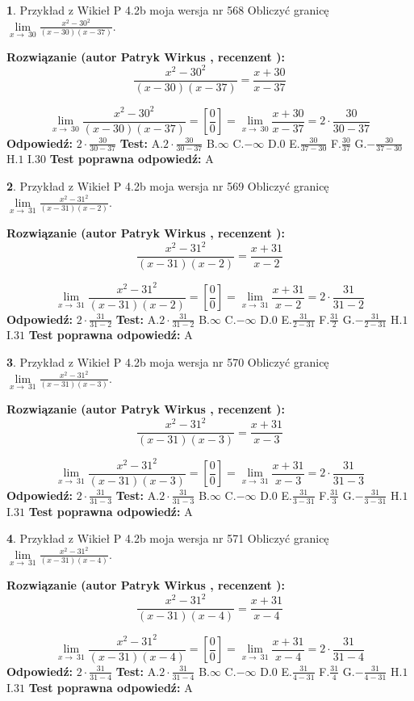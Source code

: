 \documentclass[12pt, a4paper]{article}
\theoremstyle{definition} %
\newtheorem{zad}{}
\newcommand{\zadStart}[1]{\begin{zad}#1\newline}
\newcommand{\zadStop}{\end{zad}}
\newcommand{\rozwStart}[2]{\noindent \textbf{Rozwiązanie (autor #1 , recenzent #2): }\newline}
\newcommand{\rozwStop}{\newline}
\newcommand{\odpStart}{\noindent \textbf{Odpowiedź:}\newline}
\newcommand{\odpStop}{\newline}
\newcommand{\testStart}{\noindent \textbf{Test:}\newline}
\newcommand{\testStop}{\newline}
\newcommand{\kluczStart}{\noindent \textbf{Test poprawna odpowiedź:}\newline}
\newcommand{\kluczStop}{\newline}
\begin{document}
\zadStart{Przykład z Wikieł P 4.2b moja wersja nr 568}
Obliczyć granicę $\lim\limits_{x\to\ 30}\frac{x^{2}-30^{2}}{(x-30)(x-37)}$.
\zadStop
\rozwStart{Patryk Wirkus}{}
$$\frac{x^{2}-30^{2}}{(x-30)(x-37)}=\frac{x+30}{x-37}$$

$$\lim\limits_{x\to\ 30}\frac{x^{2}-30^{2}}{(x-30)(x-37)}=[\frac{0}{0}]=\lim\limits_{x\to\ 30}\frac{x+30}{x-37}=2 \cdot \frac{30}{30-37}$$
\rozwStop
\odpStart
$2 \cdot \frac{30}{30-37}$
\odpStop
\testStart
A.$2 \cdot \frac{30}{30-37}$
B.$\infty$
C.$-\infty$
D.$0$
E.$\frac{30}{37-30}$
F.$\frac{30}{37}$
G.$-\frac{30}{37-30}$
H.$1$
I.$30$
\testStop
\kluczStart
A
\kluczStop



\zadStart{Przykład z Wikieł P 4.2b moja wersja nr 569}
Obliczyć granicę $\lim\limits_{x\to\ 31}\frac{x^{2}-31^{2}}{(x-31)(x-2)}$.
\zadStop
\rozwStart{Patryk Wirkus}{}
$$\frac{x^{2}-31^{2}}{(x-31)(x-2)}=\frac{x+31}{x-2}$$

$$\lim\limits_{x\to\ 31}\frac{x^{2}-31^{2}}{(x-31)(x-2)}=[\frac{0}{0}]=\lim\limits_{x\to\ 31}\frac{x+31}{x-2}=2 \cdot \frac{31}{31-2}$$
\rozwStop
\odpStart
$2 \cdot \frac{31}{31-2}$
\odpStop
\testStart
A.$2 \cdot \frac{31}{31-2}$
B.$\infty$
C.$-\infty$
D.$0$
E.$\frac{31}{2-31}$
F.$\frac{31}{2}$
G.$-\frac{31}{2-31}$
H.$1$
I.$31$
\testStop
\kluczStart
A
\kluczStop



\zadStart{Przykład z Wikieł P 4.2b moja wersja nr 570}
Obliczyć granicę $\lim\limits_{x\to\ 31}\frac{x^{2}-31^{2}}{(x-31)(x-3)}$.
\zadStop
\rozwStart{Patryk Wirkus}{}
$$\frac{x^{2}-31^{2}}{(x-31)(x-3)}=\frac{x+31}{x-3}$$

$$\lim\limits_{x\to\ 31}\frac{x^{2}-31^{2}}{(x-31)(x-3)}=[\frac{0}{0}]=\lim\limits_{x\to\ 31}\frac{x+31}{x-3}=2 \cdot \frac{31}{31-3}$$
\rozwStop
\odpStart
$2 \cdot \frac{31}{31-3}$
\odpStop
\testStart
A.$2 \cdot \frac{31}{31-3}$
B.$\infty$
C.$-\infty$
D.$0$
E.$\frac{31}{3-31}$
F.$\frac{31}{3}$
G.$-\frac{31}{3-31}$
H.$1$
I.$31$
\testStop
\kluczStart
A
\kluczStop



\zadStart{Przykład z Wikieł P 4.2b moja wersja nr 571}
Obliczyć granicę $\lim\limits_{x\to\ 31}\frac{x^{2}-31^{2}}{(x-31)(x-4)}$.
\zadStop
\rozwStart{Patryk Wirkus}{}
$$\frac{x^{2}-31^{2}}{(x-31)(x-4)}=\frac{x+31}{x-4}$$

$$\lim\limits_{x\to\ 31}\frac{x^{2}-31^{2}}{(x-31)(x-4)}=[\frac{0}{0}]=\lim\limits_{x\to\ 31}\frac{x+31}{x-4}=2 \cdot \frac{31}{31-4}$$
\rozwStop
\odpStart
$2 \cdot \frac{31}{31-4}$
\odpStop
\testStart
A.$2 \cdot \frac{31}{31-4}$
B.$\infty$
C.$-\infty$
D.$0$
E.$\frac{31}{4-31}$
F.$\frac{31}{4}$
G.$-\frac{31}{4-31}$
H.$1$
I.$31$
\testStop
\kluczStart
A
\kluczStop
\end{document}
